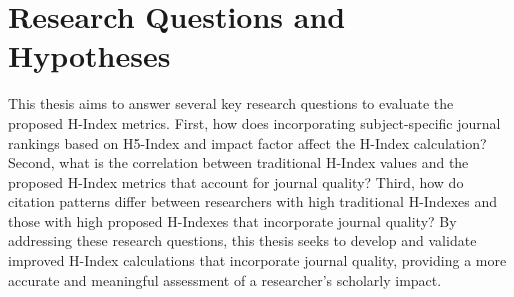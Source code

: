 \section{Research Questions and Hypotheses}
This thesis aims to answer several key research questions to evaluate the
proposed H-Index metrics. First, how does incorporating subject-specific
journal rankings based on H5-Index and impact factor affect the H-Index
calculation? Second, what is the correlation between traditional H-Index values
and the proposed H-Index metrics that account for journal quality? Third, how
do citation patterns differ between researchers with high traditional H-Indexes
and those with high proposed H-Indexes that incorporate journal quality? By
addressing these research questions, this thesis seeks to develop and validate
improved H-Index calculations that incorporate journal quality, providing a
more accurate and meaningful assessment of a researcher's scholarly impact.
